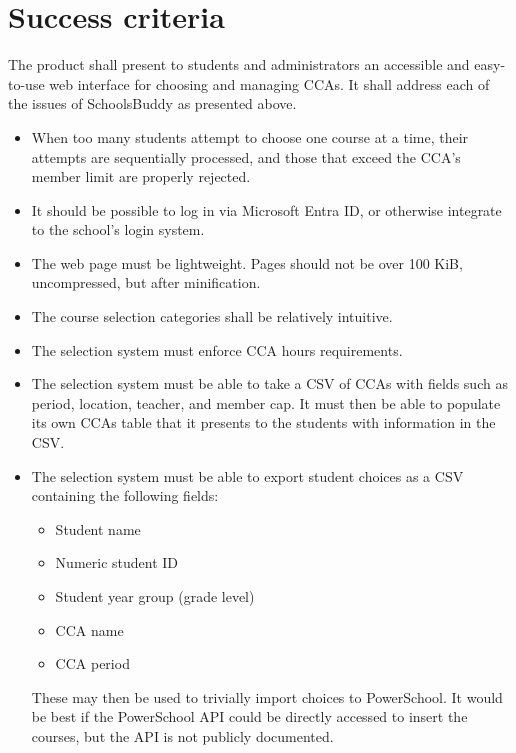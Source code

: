 \section{Success criteria}

The product shall present to students and administrators an accessible and
easy-to-use web interface for choosing and managing CCAs. It shall address each
of the issues of SchoolsBuddy as presented above.

\begin{itemize}
	\item When too many students attempt to choose one course at a time,
		their attempts are sequentially processed, and those that
		exceed the CCA's member limit are properly rejected. \item It
		should be possible to log in via Microsoft Entra ID, or
		otherwise integrate to the school's login system.
	\item The web page must be lightweight. Pages should not be over 100
		KiB, uncompressed, but after minification.
	\item The course selection categories shall be relatively intuitive.
	\item The selection system must enforce CCA hours requirements.
	\item The selection system must be able to take a CSV of CCAs with
		fields such as period, location, teacher, and member cap. It
		must then be able to populate its own CCAs table that it
		presents to the students with information in the CSV.
	\item The selection system must be able to export student choices as a
		CSV containing the following fields:
		\begin{itemize}
			\item Student name
			\item Numeric student ID
			\item Student year group (grade level)
			\item CCA name
			\item CCA period
		\end{itemize}
		These may then be used to trivially import choices to
		PowerSchool. It would be best if the PowerSchool API could be
		directly accessed to insert the courses, but the API is not
		publicly documented.
\end{itemize}


